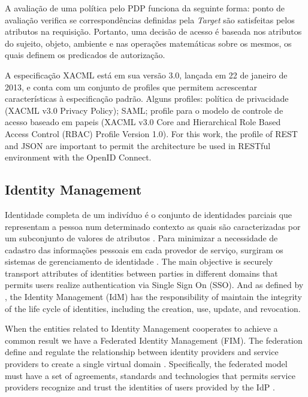 \documentclass{doublecol-new}
\begin{document}
A avaliação de uma política pelo PDP funciona da seguinte forma: ponto de avaliação verifica se correspondências definidas pela \textit{Target} são satisfeitas pelos atributos na requisição. Portanto, uma decisão de acesso é baseada nos atributos do sujeito, objeto, ambiente e nas operações matemáticas sobre os mesmos, os quais definem os predicados de autorização.
	
A especificação XACML está em sua versão 3.0, lançada em 22 de janeiro de 2013, e conta com um conjunto de profiles que permitem acrescentar características à especificação padrão. Alguns profiles: política de privacidade (XACML v3.0 Privacy Policy); SAML; profile para o modelo de controle de acesso baseado em papeis (XACML v3.0 Core and Hierarchical Role Based Access Control (RBAC) Profile Version 1.0). For this work, the profile of REST and JSON are important to permit the architecture be used in RESTful environment with the OpenID Connect.

\subsection[sec:identitymanag]{Identity Management}
Identidade completa de um indivíduo é o conjunto de identidades parciais que representam a pessoa num determinado contexto as quais são caracterizadas por um subconjunto de valores de atributos \citep{pfitzmann2010terminology}. Para minimizar a necessidade de cadastro das informações pessoais em cada provedor de serviço, surgiram os sistemas de gerenciamento de identidade \citep{el2007survey,cao2010survey}. The main objective is securely transport attributes of identities between parties in different domains that permits users realize authentication via Single Sign On (SSO). And as defined by \cite{bertino2011identity}, the Identity Management (IdM) has the responsibility of maintain the integrity of the life cycle of identities, including the creation, use, update, and revocation.

When the entities related to Identity Management cooperates to achieve a common result we have a Federated Identity Management (FIM). The federation define and regulate the relationship between identity providers and service providers to create a single virtual domain \citep{perez2014identity,cao2010survey}. Specifically, the federated model must have a set of agreements, standards and technologies that permits service providers recognize and trust the identities of users provided by the IdP \citep{torres2013survey}.
	
\end{document}
